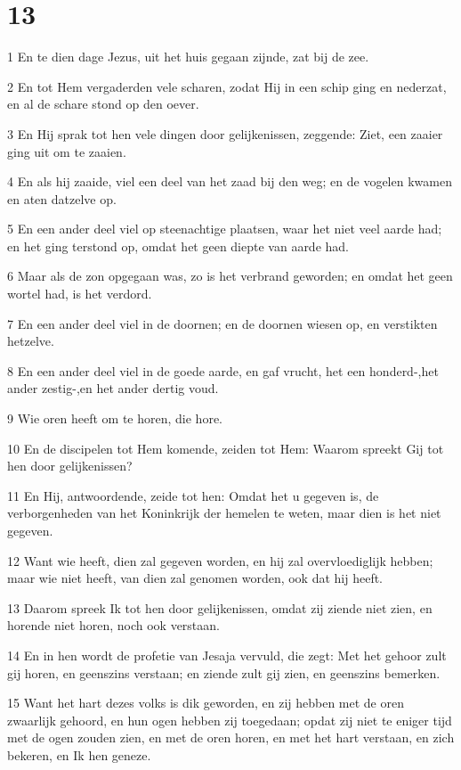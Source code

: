 \chapter{13}

\par 1 En te dien dage Jezus, uit het huis gegaan zijnde, zat bij de zee.
\par 2 En tot Hem vergaderden vele scharen, zodat Hij in een schip ging en nederzat, en al de schare stond op den oever.
\par 3 En Hij sprak tot hen vele dingen door gelijkenissen, zeggende: Ziet, een zaaier ging uit om te zaaien.
\par 4 En als hij zaaide, viel een deel van het zaad bij den weg; en de vogelen kwamen en aten datzelve op.
\par 5 En een ander deel viel op steenachtige plaatsen, waar het niet veel aarde had; en het ging terstond op, omdat het geen diepte van aarde had.
\par 6 Maar als de zon opgegaan was, zo is het verbrand geworden; en omdat het geen wortel had, is het verdord.
\par 7 En een ander deel viel in de doornen; en de doornen wiesen op, en verstikten hetzelve.
\par 8 En een ander deel viel in de goede aarde, en gaf vrucht, het een honderd-,het ander zestig-,en het ander dertig voud.
\par 9 Wie oren heeft om te horen, die hore.
\par 10 En de discipelen tot Hem komende, zeiden tot Hem: Waarom spreekt Gij tot hen door gelijkenissen?
\par 11 En Hij, antwoordende, zeide tot hen: Omdat het u gegeven is, de verborgenheden van het Koninkrijk der hemelen te weten, maar dien is het niet gegeven.
\par 12 Want wie heeft, dien zal gegeven worden, en hij zal overvloediglijk hebben; maar wie niet heeft, van dien zal genomen worden, ook dat hij heeft.
\par 13 Daarom spreek Ik tot hen door gelijkenissen, omdat zij ziende niet zien, en horende niet horen, noch ook verstaan.
\par 14 En in hen wordt de profetie van Jesaja vervuld, die zegt: Met het gehoor zult gij horen, en geenszins verstaan; en ziende zult gij zien, en geenszins bemerken.
\par 15 Want het hart dezes volks is dik geworden, en zij hebben met de oren zwaarlijk gehoord, en hun ogen hebben zij toegedaan; opdat zij niet te eniger tijd met de ogen zouden zien, en met de oren horen, en met het hart verstaan, en zich bekeren, en Ik hen geneze.
